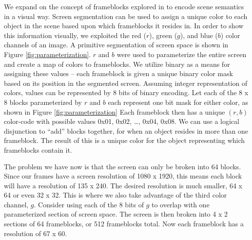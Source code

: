 \documentclass[conference]{IEEEtran}
\begin{document}
We expand on the concept of frameblocks explored in \cite{thesis_harris}
to encode scene semantics in a visual way.
Screen segmentation can be used to assign a unique color to each object in the scene
based upon which frameblocks it resides in.
In order to show this information visually, we exploited the
red ($r$), green ($g$), and blue ($b$) color channels of an image.
A primitive segmentation of screen space is shown in Figure \ref{fig:parameterization}.
$r$ and $b$ were used to parameterize the entire screen
and create a map of colors to frameblocks.
We utilize binary as a means for assigning these values --
each frameblock is given a unique binary color mask based on its position
in the segmented screen.
Assuming integer representation of colors,
values can be represented by 8 bits of binary encoding.
Let each of the 8 x 8 blocks parameterized by $r$ and $b$ each represent one bit mask
for either color,
as shown in Figure \ref{fig:parameterization}
Each frameblock then has a unique $(r,b)$ color-code
with possible values 0x01, 0x02, \dots, 0x04, 0x08.
We can use a logical disjunction to ``add'' blocks together, for when
an object resides in more than one frameblock.
The result of this is a unique color for the object representing which frameblocks contain it.

The problem we have now is that the screen can only be broken into 64 blocks.
Since our frames have a screen resolution of 1080 x 1920, this means each block will have
a resolution of 135 x 240. The desired resolution is much smaller, 64 x 64
or even 32 x 32.
This is where we also take advantage of the third color channel, $g$.
Consider using each of the 8 bits of $g$
to overlap with one parameterized section of screen space.
The screen is then broken into 4 x 2 sections of 64 frameblocks, or 512 frameblocks total.
Now each frameblock has a resolution of 67 x 60.
\end{document}
